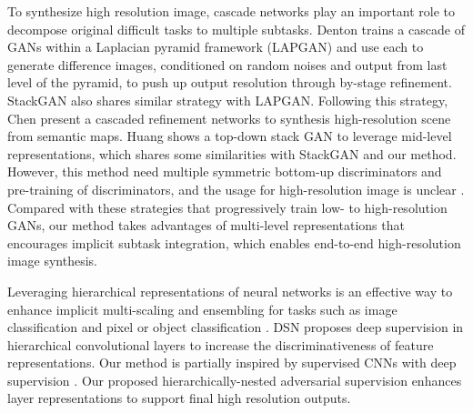 \documentclass[10pt,twocolumn,letterpaper]{article}
\begin{document}

To synthesize high resolution image, cascade networks play an important role to decompose original difficult tasks to multiple subtasks.
Denton \etal \cite{denton2015deep} trains a cascade of GANs within a Laplacian pyramid framework (LAPGAN) and use each to generate difference images, conditioned on random noises and output from last level of the pyramid, to push up output resolution through by-stage refinement. StackGAN also shares similar strategy with LAPGAN. Following this strategy, Chen \etal \cite{chen2017photographic} present a cascaded refinement networks to synthesis high-resolution scene from semantic maps. 
Huang \etal \cite{huang2016stacked}
shows a top-down stack GAN to leverage mid-level representations, which shares some similarities with StackGAN and our method. However, this method need multiple symmetric  bottom-up discriminators and pre-training of discriminators, and the usage for high-resolution image is unclear \cite{han2017stackgan}. Compared with these strategies that progressively train low- to high-resolution GANs, our method takes advantages of multi-level representations that encourages implicit subtask integration, which enables end-to-end high-resolution image synthesis.


Leveraging hierarchical representations of neural networks is an effective way to enhance implicit multi-scaling and ensembling for tasks such as image classification \cite{lee2015deeply} and pixel or object classification \cite{xie2015holistically,cai2016unified,long2015fully}. DSN \cite{lee2015deeply} proposes deep supervision in hierarchical convolutional layers to increase the discriminativeness of feature representations. 
Our method is partially inspired by supervised CNNs with deep supervision \cite{lee2015deeply,xie2015holistically}. Our proposed hierarchically-nested adversarial supervision enhances layer representations to support final high resolution outputs.   
\begin{figure}[t]
	\centering
	\caption{} \label{fig:archs}
\end{figure}
\end{document}
